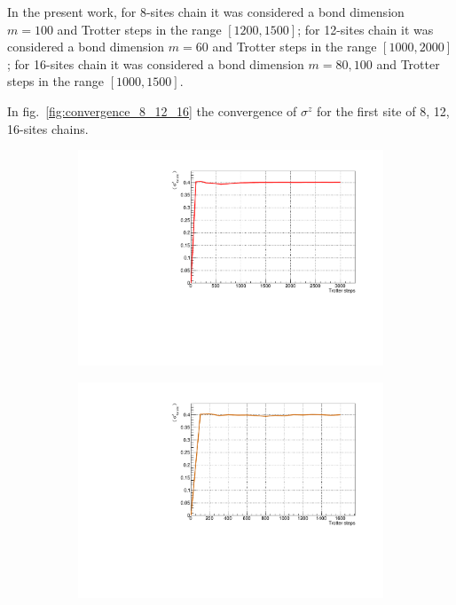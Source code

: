 In the present work, for 8-sites chain it was considered a bond dimension $m = 100$ and Trotter steps in the range $[1200, 1500]$; for 12-sites chain it was considered a bond dimension $m = 60$ and Trotter steps in the range $[1000, 2000]$; for 16-sites chain it was considered a bond dimension $m = 80, 100$ and Trotter steps in the range $[1000, 1500]$.

In fig.~\ref{fig:convergence_8_12_16} the convergence of $\sigma^z$ for the first site of 8, 12, 16-sites chains. 

\begin{figure}[H]
\centering
\begin{subfigure}{\columnwidth}
\centering
    \includegraphics[scale=0.6]{Figures/convergence/Convergence_s8T3000J1051.pdf}
    \label{fig:8sites_LMvsGamma}
\end{subfigure}\quad
\begin{subfigure}{\columnwidth}
\centering
    \includegraphics[scale=0.6]{Figures/convergence/Convergence_LM_L012_m060_Time001600_J1051.pdf}

\end{subfigure}
\end{figure}
